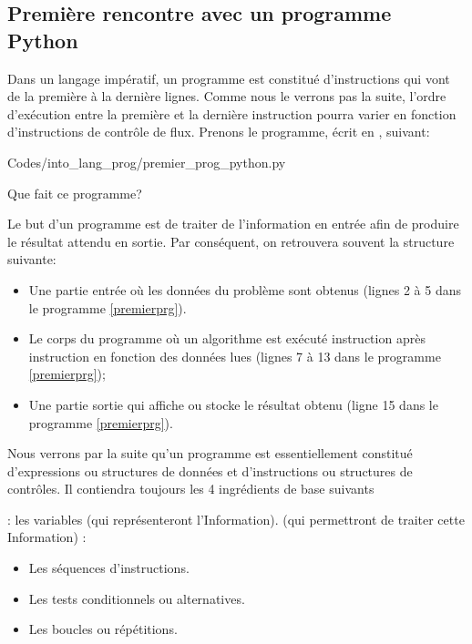 \subsection{Première rencontre avec un programme Python}
Dans un langage impératif, un programme est constitué d'instructions qui vont de la première à la dernière lignes. Comme nous le verrons pas la suite, l'ordre d'exécution entre la première et la dernière instruction pourra varier en fonction d'instructions de contrôle de flux. Prenons le programme, écrit en \py, suivant:

\vspace{-0.7cm}
\begin{monprogramme}
	
	{Codes/into_lang_prog/premier_prog_python.py}
\end{monprogramme}
%
\begin{question}
	Que fait ce programme?
\end{question}


\begin{eclairage}
	Le but d'un programme est de traiter de l'information en entrée afin de produire le résultat attendu en sortie. Par conséquent, on retrouvera souvent la structure suivante:
	\begin{itemize}
		\item Une partie entrée où les données du problème sont obtenus (lignes 2 à 5 dans le programme \ref{premierprg}).
		\item Le corps du programme où un algorithme est exécuté instruction après instruction en fonction des données lues (lignes 7 à 13 dans le programme \ref{premierprg});
		\item Une partie sortie qui affiche ou stocke le résultat obtenu (ligne 15 dans le programme \ref{premierprg}).
	\end{itemize}
	Nous verrons par la suite qu'un programme est essentiellement constitué d’expressions ou structures de données et d’instructions ou structures de contrôles. Il contiendra toujours les 4 ingrédients de base suivants
	\begin{itemize}
		 : les variables (qui représenteront l’Information).
		 (qui permettront de traiter cette Information) :
		\begin{itemize}
			\item Les séquences d’instructions.
			\item Les tests conditionnels ou alternatives.
			\item Les boucles ou répétitions.
		\end{itemize}
	\end{itemize}
\end{eclairage}
